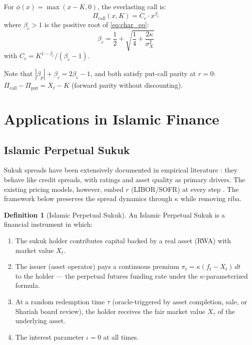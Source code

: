 \documentclass[10pt,twocolumn]{article}
\theoremstyle{plain}
\theoremstyle{definition}
\newtheorem{definition}{Definition}
\begin{document}
For $\phi(x) = \max(x - K, 0)$, the everlasting call is:
\begin{equation}
\Pi_{\mathrm{call}}(x, K) = C_c \cdot x^{\beta_c}
\label{eq:evcall}
\end{equation}
where $\beta_c > 1$ is the positive root of \eqref{eq:char_eq}:
\begin{equation}
\beta_c = \frac{1}{2} + \sqrt{\frac{1}{4} + \frac{2\kappa}{\sigma_X^2}}
\label{eq:beta_c}
\end{equation}
with $C_c = K^{1-\beta_c}/(\beta_c - 1)$.

Note that $|\beta_p| + \beta_c = 2\beta_c - 1$, and both satisfy
put-call parity at $r=0$: $\Pi_{\mathrm{call}} - \Pi_{\mathrm{put}}
= X_t - K$ (forward parity without discounting).

\section{Applications in Islamic Finance}
\label{sec:applications}

\subsection{Islamic Perpetual Sukuk}
\label{sec:sukuk}

Sukuk spreads have been extensively documented in empirical literature
\cite{Reboredo2021,Hassan2021,CakirRaei2007}: they behave like credit
spreads, with ratings and asset quality as primary drivers. The
existing pricing models, however, embed $r$ (LIBOR/SOFR) at every
step \cite{KhanAbdallah2017,JobstHull2008}. The framework below
preserves the spread dynamics through $\kappa$ while removing riba.

\begin{definition}[Islamic Perpetual Sukuk]
An Islamic Perpetual Sukuk is a financial instrument in which:
\begin{enumerate}[leftmargin=*,noitemsep]
\item The sukuk holder contributes capital backed by a real
asset (RWA) with market value $X_t$.
\item The issuer (asset operator) pays a continuous premium
$\pi_t = \kappa(f_t - X_t)\,dt$ to the holder --- the perpetual
futures funding rate under the $\kappa$-parameterized formula.
\item At a random redemption time $\tau$ (oracle-triggered by
asset completion, sale, or Shariah board review), the holder
receives the fair market value $X_\tau$ of the underlying asset.
\item The interest parameter $\iota = 0$ at all times.
\end{enumerate}
\end{definition}
\end{document}
